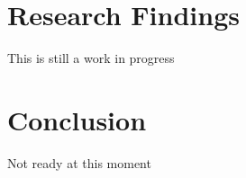 \documentclass[12pt,english]{article}
\begin{document}
\section{Research Findings}\label{sec:results}
This is still a work in progress

\section{Conclusion}\label{sec:conclusion}
Not ready at this moment

\vfill
\pagebreak{}
\begin{spacing}{1.0}


\end{spacing}

\vfill
\pagebreak{}
\clearpage
\end{document}

